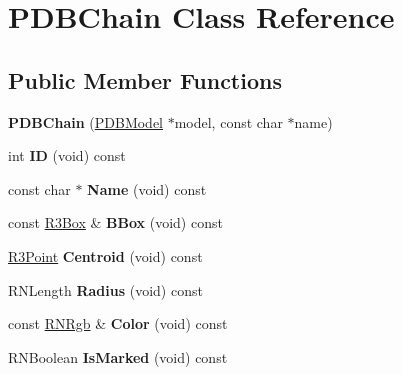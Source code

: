 \hypertarget{class_p_d_b_chain}{}\section{P\+D\+B\+Chain Class Reference}
\label{class_p_d_b_chain}
\subsection*{Public Member Functions}
\begin{DoxyCompactItemize}
\item 
{\bfseries P\+D\+B\+Chain} (\hyperlink{class_p_d_b_model}{P\+D\+B\+Model} $\ast$model, const char $\ast$name)\hypertarget{class_p_d_b_chain_a02800d664e229dedc96d8e113c0e2dce}{}\label{class_p_d_b_chain_a02800d664e229dedc96d8e113c0e2dce}

\item 
int {\bfseries ID} (void) const \hypertarget{class_p_d_b_chain_a8a7d189f02f66b4d9b92f73548372616}{}\label{class_p_d_b_chain_a8a7d189f02f66b4d9b92f73548372616}

\item 
const char $\ast$ {\bfseries Name} (void) const \hypertarget{class_p_d_b_chain_a508371f256079999d41b4ca7a1efa202}{}\label{class_p_d_b_chain_a508371f256079999d41b4ca7a1efa202}

\item 
const \hyperlink{class_r3_box}{R3\+Box} \& {\bfseries B\+Box} (void) const \hypertarget{class_p_d_b_chain_a844b4fcc4b41beb60b2bc440b3132586}{}\label{class_p_d_b_chain_a844b4fcc4b41beb60b2bc440b3132586}

\item 
\hyperlink{class_r3_point}{R3\+Point} {\bfseries Centroid} (void) const \hypertarget{class_p_d_b_chain_afc65b7ab8b3a1a08115e0b65e680ba6d}{}\label{class_p_d_b_chain_afc65b7ab8b3a1a08115e0b65e680ba6d}

\item 
R\+N\+Length {\bfseries Radius} (void) const \hypertarget{class_p_d_b_chain_a07d975d63c6db4cf16e562b659f70850}{}\label{class_p_d_b_chain_a07d975d63c6db4cf16e562b659f70850}

\item 
const \hyperlink{class_r_n_rgb}{R\+N\+Rgb} \& {\bfseries Color} (void) const \hypertarget{class_p_d_b_chain_a679f7470bd05e7305c29e5032d9d8479}{}\label{class_p_d_b_chain_a679f7470bd05e7305c29e5032d9d8479}

\item 
R\+N\+Boolean {\bfseries Is\+Marked} (void) const \hypertarget{class_p_d_b_chain_ab3775165ea93b3795cd16f48dca6759c}{}\label{class_p_d_b_chain_ab3775165ea93b3795cd16f48dca6759c}


\end{DoxyCompactItemize}
